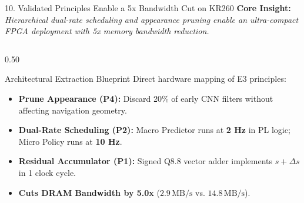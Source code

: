\documentclass[aspectratio=169, 10pt]{beamer}
\begin{document}
\begin{frame}{10. Validated Principles Enable a 5x Bandwidth Cut on KR260}
  \textbf{Core Insight:} \textit{Hierarchical dual-rate scheduling and appearance pruning enable an ultra-compact FPGA deployment with 5x memory bandwidth reduction.}

  \vspace{0.2cm}
  \begin{columns}[T]
    \begin{column}{0.50\textwidth}
      \begin{block}{Architectural Extraction Blueprint}
        \small
        Direct hardware mapping of E3 principles:
        \begin{itemize}
          \item \textbf{Prune Appearance (P4):} Discard 20\% of early CNN filters without affecting navigation geometry.
          \item \textbf{Dual-Rate Scheduling (P2):} Macro Predictor runs at \textbf{2 Hz} in PL logic; Micro Policy runs at \textbf{10 Hz}.
          \item \textbf{Residual Accumulator (P1):} Signed Q8.8 vector adder implements $s + \Delta s$ in 1 clock cycle.
          \item \textbf{Cuts DRAM Bandwidth by 5.0x} ($2.9\,\mathrm{MB/s}$ vs. $14.8\,\mathrm{MB/s}$).
        \end{itemize}
      \end{block}
    \end{column}


\end{columns}
\end{frame}
\end{document}
